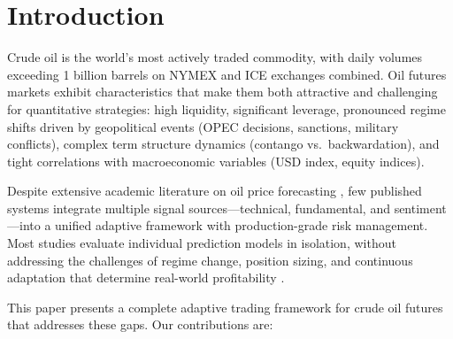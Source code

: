 \documentclass[12pt,a4paper]{article}
\begin{document}
\newpage
\tableofcontents
\newpage

\section{Introduction}
\label{sec:introduction}

Crude oil is the world's most actively traded commodity, with daily volumes exceeding 1 billion barrels on NYMEX and ICE exchanges combined. Oil futures markets exhibit characteristics that make them both attractive and challenging for quantitative strategies: high liquidity, significant leverage, pronounced regime shifts driven by geopolitical events (OPEC decisions, sanctions, military conflicts), complex term structure dynamics (contango vs.\ backwardation), and tight correlations with macroeconomic variables (USD index, equity indices).

Despite extensive academic literature on oil price forecasting \citep{baumeister2012real, zhang2019crude}, few published systems integrate multiple signal sources---technical, fundamental, and sentiment---into a unified adaptive framework with production-grade risk management. Most studies evaluate individual prediction models in isolation, without addressing the challenges of regime change, position sizing, and continuous adaptation that determine real-world profitability \citep{lopezdeprado2018advances}.

This paper presents a complete adaptive trading framework for crude oil futures that addresses these gaps. Our contributions are:
\end{document}
